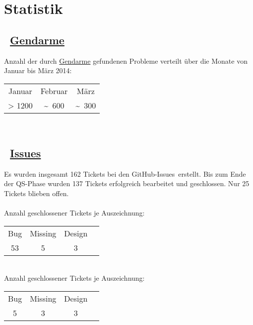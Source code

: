 %



\newpage



\section{Statistik}
\label{Abschnitt:Programmfehler:Statistik}





\subsection*{\mousecursor~\hyperref[Abschnitt:Programmfehler:Werkzeuge:Automatisiert]{Gendarme}}

Anzahl der durch \hyperref[Abschnitt:Programmfehler:Werkzeuge:Automatisiert]{Gendarme} gefundenen Probleme verteilt über die Monate von Januar bis März 2014:\\

\begin{longtable}{ccc}

	  Januar
	& Februar
	& März
	
	\\
	
      > 1200
	& \textasciitilde~600
	& \textasciitilde~300

\end{longtable}


~\\

\subsection*{\mousecursor~\hyperref[Abschnitt:Programmfehler:Werkzeuge:Manuell]{\glqq Issues\grqq}}

Es wurden insgesamt 162 Tickets bei den GitHub-\glqq Issues\grqq~erstellt. Bis zum Ende der QS-Phase wurden 137 Tickets erfolgreich bearbeitet und geschlossen. Nur 25 Tickets blieben offen.\\~\\

Anzahl geschlossener Tickets je Auszeichnung:\\

\begin{longtable}{cccc}

	  Bug
	& Missing
	& Design
	
	\\
	
      53
	& 5
	& 3

\end{longtable}

~\\

Anzahl geschlossener Tickets je Auszeichnung:\\

\begin{longtable}{cccc}

	  Bug
	& Missing
	& Design
	
	\\
	
      5
	& 3
	& 3

\end{longtable}

~\\





